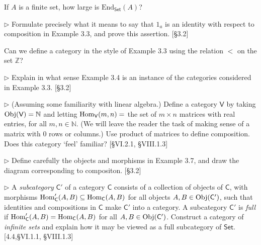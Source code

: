 \begin{problem}
  If $A$ is a finite set, how large is $\mathrm{End}_{\mathsf{Set}}(A)$?
\end{problem}

\begin{problem}
  $\rhd$ Formulate precisely what it means to say that $1_a$ is an identity
  with respect to composition in Example 3.3, and prove this assertion.
  [\S3.2]
\end{problem}

\begin{problem}
  Can we define a category in the style of Example 3.3 using the relation
  $<$ on the set $\mathbb{Z}$?
\end{problem}

\begin{problem}
  $\rhd$ Explain in what sense Example 3.4 is an instance of the categories
  considered in Example 3.3. [\S 3.2]
\end{problem}

\begin{problem}
  $\rhd$ (Assuming some familiarity with linear algebra.) Define a category
  $\mathsf{V}$ by taking $\mathrm{Obj}(\mathsf{V}) = \mathbb{N}$ and letting
  $\mathrm{Hom}_{\mathsf{V}}(m,n) = $ the set of $m\times n$ matrices with real
  entries, for all $m,n\in\mathbb{N}$. (We will leave the reader the task of
  making sense of a matrix with 0 rows or columns.) Use product of matrices
  to define composition. Does this category `feel' familiar?
  [\S VI.2.1, \S VIII.1.3]
\end{problem}

\begin{problem}
  $\rhd$ Define carefully the objects and morphisms in Example 3.7, and draw
  the diagram corresponding to compositon. [\S 3.2]
\end{problem}

\begin{problem}
  \def \C {\mathsf{C}}
  \def \Cp {\C'}

  $\rhd$ A \textit{subcategory} $\Cp$ of a category $\C$ consists of a
  collection of objects of $\C$, with morphisms $\Hom_\Cp(A,B) \subseteq
  \Hom_\C(A,B)$ for all objects $A,B\in\Obj(\Cp)$, such that identities and
  compositions in $\C$ make $\Cp$ into a category. A subcategory $\Cp$ is
  \textit{full} if $\Hom_\Cp(A,B) = \Hom_\C(A,B)$ for all $A,B\in\Obj(\Cp)$.
  Construct a category of \textit{infinite sets} and explain how it may be
  viewed as a full subcategory of $\mathsf{Set}$. [4.4,\S VI.1.1,
  \S VIII.1.3]
\end{problem}

